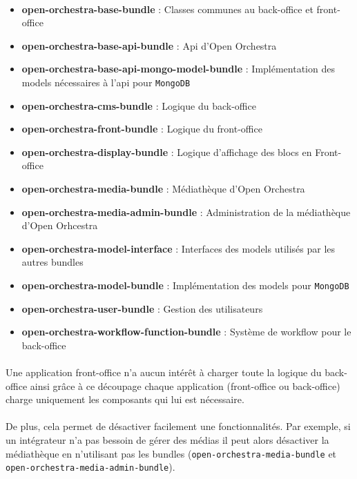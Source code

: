    \paragraph{}
   \begin{itemize}
   \item \textbf{open-orchestra-base-bundle} : Classes communes au back-office et front-office
   \item \textbf{open-orchestra-base-api-bundle} : Api d'Open Orchestra
   \item \textbf{open-orchestra-base-api-mongo-model-bundle} : Implémentation des models nécessaires à l'api pour \verb?MongoDB? 
   \item \textbf{open-orchestra-cms-bundle} : Logique du back-office
   \item \textbf{open-orchestra-front-bundle} : Logique du front-office
   \item \textbf{open-orchestra-display-bundle} : Logique d'affichage des blocs en Front-office
   \item \textbf{open-orchestra-media-bundle} : Médiathèque d'Open Orchestra
   \item \textbf{open-orchestra-media-admin-bundle} : Administration de la médiathèque d'Open Orhcestra
   \item \textbf{open-orchestra-model-interface} : Interfaces des models utilisés par les autres bundles 
   \item \textbf{open-orchestra-model-bundle} : Implémentation des models pour \verb?MongoDB? 
   \item \textbf{open-orchestra-user-bundle} : Gestion des utilisateurs 
   \item \textbf{open-orchestra-workflow-function-bundle} : Système de workflow pour le back-office 
   \end{itemize}
   \paragraph{}
    Une application front-office n'a aucun intérêt à charger toute la logique du back-office ainsi grâce à ce découpage chaque application (front-office ou back-office) charge uniquement les composants qui lui est nécessaire.
   \paragraph{}
   De plus, cela permet de désactiver facilement une fonctionnalités. Par exemple, si un intégrateur n'a pas bessoin de gérer des médias il peut alors désactiver la médiathèque en n'utilisant pas les bundles (\verb?open-orchestra-media-bundle? et \verb?open-orchestra-media-admin-bundle?).

